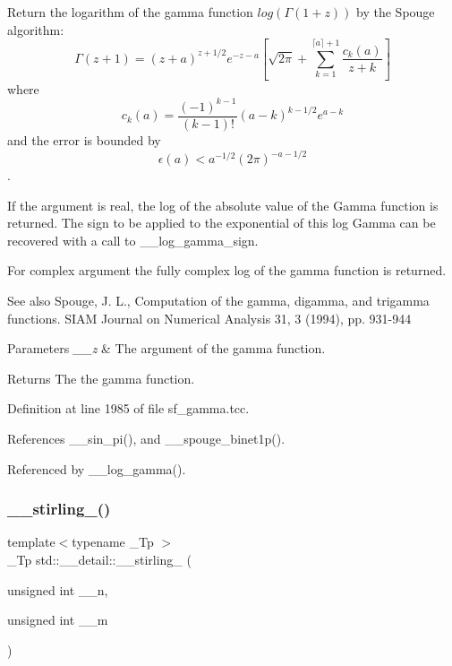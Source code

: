 Return the logarithm of the gamma function $ log(\Gamma(1+z)) $ by the Spouge algorithm\+: \[ \Gamma(z+1) = (z+a)^{z+1/2}e^{-z-a}\left[ \sqrt{2\pi} + \sum_{k=1}^{\lceil a \rceil + 1}\frac{c_k(a)}{z+k}\right] \] where \[ c_k(a) = \frac{(-1)^{k-1}}{(k-1)!}(a-k)^{k-1/2}e^{a-k} \] and the error is bounded by \[ \epsilon(a) < a^{-1/2}(2\pi)^{-a-1/2} \]. 

If the argument is real, the log of the absolute value of the Gamma function is returned. The sign to be applied to the exponential of this log Gamma can be recovered with a call to \+\_\+\+\_\+log\+\_\+gamma\+\_\+sign.

For complex argument the fully complex log of the gamma function is returned.

\begin{DoxySeeAlso}{See also}
Spouge, J. L., Computation of the gamma, digamma, and trigamma functions. S\+I\+AM Journal on Numerical Analysis 31, 3 (1994), pp. 931-\/944
\end{DoxySeeAlso}

\begin{DoxyParams}{Parameters}
{\em \+\_\+\+\_\+z} & The argument of the gamma function. \\
\hline
\end{DoxyParams}
\begin{DoxyReturn}{Returns}
The the gamma function. 
\end{DoxyReturn}


Definition at line 1985 of file sf\+\_\+gamma.\+tcc.



References \+\_\+\+\_\+sin\+\_\+pi(), and \+\_\+\+\_\+spouge\+\_\+binet1p().



Referenced by \+\_\+\+\_\+log\+\_\+gamma().

\mbox{\label{namespacestd_1_1____detail_a8b215e4ca28ec9b7b078d7f3d9aecc17}} 
\subsubsection{\texorpdfstring{\+\_\+\+\_\+stirling\+\_()}{\_\_stirling\_1()}}
{\footnotesize\ttfamily template$<$typename \+\_\+\+Tp $>$ \\
\+\_\+\+Tp std\+::\+\_\+\+\_\+detail\+::\+\_\+\+\_\+stirling\+\_ (\begin{DoxyParamCaption}\item[{unsigned int}]{\+\_\+\+\_\+n,  }\item[{unsigned int}]{\+\_\+\+\_\+m }\end{DoxyParamCaption})}

